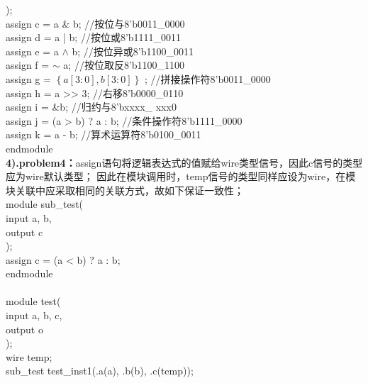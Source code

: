 \documentclass[12pt]{ctexart}
\begin{document}
);\\
\hspace*{0.5cm}assign c = a \& b;       //按位与8'b0011\_0000\\
\hspace*{0.5cm}assign d = a | b;       //按位或8'b1111\_0011\\
\hspace*{0.5cm}assign e = a $\wedge$ b;       //按位异或8'b1100\_0011\\
\hspace*{0.5cm}assign f = $\sim$ a;          //按位取反8'b1100\_1100\\
\hspace*{0.5cm}assign g = $\left \{  a[3:0], b[3:0]\right \}$ ;    //拼接操作符8'b0011\_0000\\
\hspace*{0.5cm}assign h = a >> 3;              //右移8'b0000\_0110\\
\hspace*{0.5cm}assign i = \&b;                  //归约与8'bxxxx\_ xxx0\\
\hspace*{0.5cm}assign j = (a > b) ? a : b;     //条件操作符8'b1111\_0000\\
\hspace*{0.5cm}assign k = a - b;               //算术运算符8'b0100\_0011\\
endmodule\\
{\bf4).problem4：}assign语句将逻辑表达式的值赋给wire类型信号，因此c信号的类型应为wire默认类型；
因此在模块调用时，temp信号的类型同样应设为wire，在模块关联中应采取相同的关联方式，故如下保证一致性；\\
module sub\_test(\\
input a, b,\\
output  c\\
);\\
\hspace*{0.5cm}assign c = (a < b) ? a : b;\\
endmodule\\\\
module test(\\
input a, b, c,\\
output o\\
);\\
\hspace*{0.5cm}wire temp;\\
\hspace*{0.5cm}sub\_test test\_inst1(.a(a), .b(b), .c(temp));\\
\end{document}
